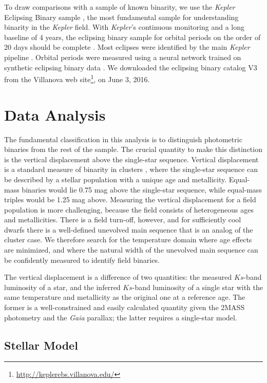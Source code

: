 \documentclass[twocolumn]{aastex6}
\newcommand{\Kepler}{\mbox{\textit{Kepler}}}
\newcommand{\Gaia}{\mbox{\textit{Gaia}}}
\begin{document}
To draw comparisons with a sample of known binarity, we use the 
 \Kepler{} Eclipsing Binary sample \citep{Prsa11,Kirk16},
the most fundamental sample for understanding binarity in the \Kepler{} field. 
With \Kepler{}'s continuous monitoring and a long baseline of 4 years, the 
eclipsing binary sample for orbital periods on the order of 20 days should be 
complete \citep{Kirk16}. Most eclipses were identified by the main
\Kepler{} pipeline \citep{Jenkins10}. Orbital periods were measured using a
neural network trained on synthetic eclipsing binary data \citep{Prsa08}. 
We downloaded the eclipsing binary catalog V3 from the Villanova web 
site\footnote{\url{http://keplerebs.villanova.edu/}}, on June 3, 2016. 

\section{Data Analysis}
\label{sec:analysis}

The fundamental classification in this analysis is to distinguish photometric
binaries from the rest of the sample. The crucial quantity to make this
distinction is the 
vertical displacement above the single-star sequence. Vertical 
displacement is a standard measure of binarity in clusters 
\citep{Mermilliod92}, where the single-star sequence can be described by a
stellar population with a unique age and metallicity. Equal-mass binaries
would lie 0.75 mag above the single-star sequence, while equal-mass triples would be
1.25 mag above. Measuring the vertical displacement for a field population is 
more challenging, because the
field consists of heterogeneous ages and metallicities. There is a
field turn-off, however, and for sufficiently cool dwarfs there is a
well-defined unevolved main sequence that is an analog of the cluster case. We
therefore search for the temperature domain where age effects are minimized, 
and where the natural width of the unevolved main sequence can be confidently
measured to identify field binaries.

The vertical displacement is a difference of two quantities: the measured 
\(Ks\)-band luminosity of a star, and the inferred \(Ks\)-band luminosity of a 
single star with the same temperature and metallicity as the original one at a 
reference age. The former is a well-constrained and easily calculated quantity 
given the 2MASS photometry and the \Gaia{} parallax; the latter requires a 
single-star model.

\subsection{Stellar Model}
\end{document}
